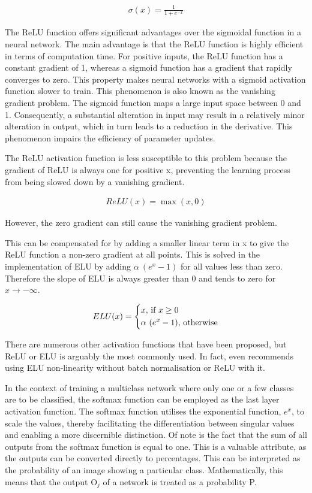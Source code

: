 \documentclass[
a4paper, 
12pt,
grayscalebody, %
abstract=on,
twoside, BCOR10mm, 12pt, DIV13,headinclude, footexclude, final, abstracton, openright
]{ibireprt}
\numberwithin{equation}{chapter}
\numberwithin{table}{chapter}
\numberwithin{figure}{chapter}
\numberwithin{algorithm}{chapter}
\numberwithin{example}{chapter}
\numberwithin{example}{chapter}
\begin{document}
\begin{align}
	\sigma (x)= \frac{1}{1+e^{-x}}
\end{align}

The ReLU function offers significant advantages over the sigmoidal function in a neural network. The main advantage is that the ReLU function is highly efficient in terms of computation time. For positive inputs, the ReLU function has a constant gradient of 1, whereas a sigmoid function has a gradient that rapidly converges to zero. This property makes neural networks with a sigmoid activation function slower to train. This phenomenon is also known as the vanishing gradient problem. The sigmoid function maps a large input space between 0 and 1. Consequently, a substantial alteration in input may result in a relatively minor alteration in output, which in turn leads to a reduction in the derivative. This phenomenon impairs the efficiency of parameter updates. 


The ReLU activation function is less susceptible to this problem because the gradient of ReLU is always one for positive x, preventing the learning process from being slowed down by a vanishing gradient. 


\begin{align}
	ReLU(x) = \max(x,0)
\end{align}

However, the zero gradient can still cause the vanishing gradient problem.

This can be compensated for by adding a smaller linear term in x to give the ReLU function a non-zero gradient at all points. This is solved in the implementation of ELU by adding $\alpha \ (e^x-1)$ for all values less than zero. Therefore the slope of ELU is always greater than 0 and tends to zero for $x \rightarrow - \infty$.


\begin{align}
	ELU(x) = 
	\begin{dcases}
		x \text{, if } x \geq 0 \\
		\alpha \ (e^x-1) \text{, otherwise}
	\end{dcases}
\end{align}

There are numerous other activation functions that have been proposed, but ReLU or ELU is arguably the most commonly used. In fact, \citet{Mishkin2017} even recommends using ELU non-linearity without batch normalisation or ReLU with it.

In the context of training a multiclass network where only one or a few classes are to be classified, the softmax function can be employed as the last layer activation function. The softmax function utilises the exponential function, $e^x$, to scale the values, thereby facilitating the differentiation between singular values and enabling a more discernible distinction. Of note is the fact that the sum of all outputs from the softmax function is equal to one. This is a valuable attribute, as the outputs can be converted directly to percentages. This can be interpreted as the probability of an image showing a particular class. Mathematically, this means that the output O$_j$ of a network is treated as a probability P.
\end{document}
